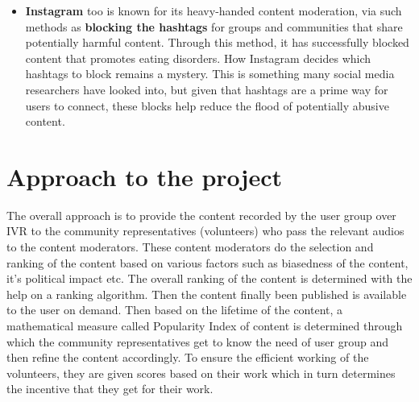 \documentclass[11pt]{article}
\begin{document}
\begin{itemize}
        \item \textbf{Instagram} too is known for its heavy-handed content moderation, via such methods as \textbf{blocking the hashtags} for groups and communities that share potentially harmful content. Through this method, it has successfully blocked content that promotes eating disorders. How Instagram decides which hashtags to block remains a mystery. This is something many social media researchers have looked into, but given that hashtags are a prime way for users to connect, these blocks help reduce the flood of potentially abusive content.
        
    \end{itemize}


\section{Approach to the project}
    The overall approach is to provide the content recorded by the user group over IVR to the community representatives (volunteers) who pass the relevant audios to the content moderators. These content moderators do the selection and ranking of the content based on various factors such as biasedness of the content, it's political impact etc. The overall ranking of the content is determined with the help on a ranking algorithm. Then the content finally been published is available to the user on demand. Then based on the lifetime of the content, a mathematical measure called Popularity Index of content is determined through which the community representatives get to know the need of user group and then refine the content accordingly. To ensure the efficient working of the volunteers, they are given scores based on their work which in turn determines the incentive that they get for their work.
\end{document}
